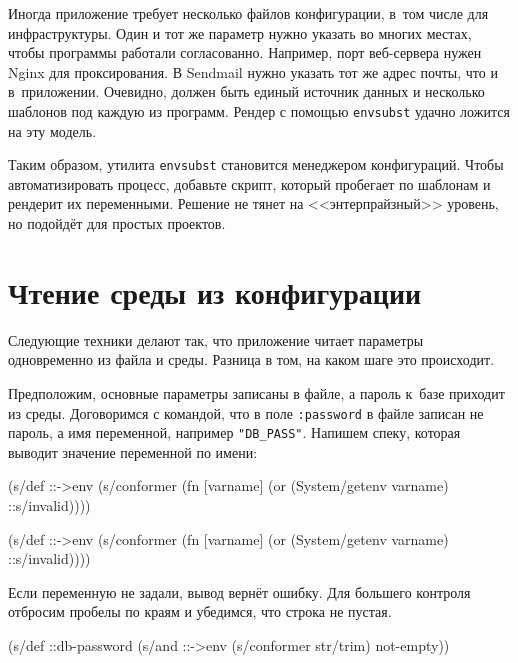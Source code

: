 Иногда приложение требует несколько файлов конфигурации, в~том числе для
инфраструктуры. Один и тот же параметр нужно указать во многих местах, чтобы
программы работали согласованно. Например, порт веб-сервера нужен Nginx для
проксирования. В Sendmail нужно указать тот же адрес почты, что и
в~приложении. Очевидно, должен быть единый источник данных и несколько шаблонов
под каждую из программ. Рендер с помощью \verb|envsubst| удачно ложится на эту
модель.

Таким образом, утилита \verb|envsubst| становится менеджером конфигураций. Чтобы
автоматизировать процесс, добавьте скрипт, который пробегает по шаблонам и
рендерит их переменными. Решение не тянет на <<энтерпрайзный>> уровень, но
подойдёт для простых проектов.

\section{Чтение среды из конфигурации}

Следующие техники делают так, что приложение читает параметры одновременно из
файла и среды. Разница в том, на каком шаге это происходит.

Предположим, основные параметры записаны в файле, а пароль к~базе приходит из
среды. Договоримся с командой, что в поле \verb|:password| в файле записан не
пароль, а имя переменной, например \verb|"DB_PASS"|. Напишем спеку, которая
выводит значение переменной по имени:

\ifnarrow

\begin{english}
  \begin{clojure}
(s/def ::->env
  (s/conformer
   (fn [varname]
     (or (System/getenv varname)
         ::s/invalid))))
  \end{clojure}
\end{english}

\else

\begin{english}
  \begin{clojure}
(s/def ::->env
  (s/conformer
   (fn [varname]
     (or (System/getenv varname) ::s/invalid))))
  \end{clojure}
\end{english}

\fi

Если переменную не задали, вывод вернёт ошибку. Для большего контроля
отбросим пробелы по краям и убедимся, что строка не пустая.

\begin{english}
  \begin{clojure}
(s/def ::db-password
  (s/and ::->env
         (s/conformer str/trim)
         not-empty))
  \end{clojure}
\end{english}


